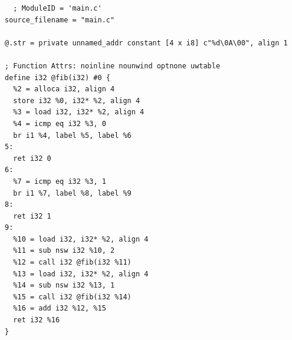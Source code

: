 \documentclass[dvipdfmx]{jarticle}
\begin{document}
\begin{Verbatim}
  ; ModuleID = 'main.c'
source_filename = "main.c"

@.str = private unnamed_addr constant [4 x i8] c"%d\0A\00", align 1

; Function Attrs: noinline nounwind optnone uwtable
define i32 @fib(i32) #0 {
  %2 = alloca i32, align 4
  store i32 %0, i32* %2, align 4
  %3 = load i32, i32* %2, align 4
  %4 = icmp eq i32 %3, 0
  br i1 %4, label %5, label %6
5:
  ret i32 0
6:
  %7 = icmp eq i32 %3, 1
  br i1 %7, label %8, label %9
8:
  ret i32 1
9:
  %10 = load i32, i32* %2, align 4
  %11 = sub nsw i32 %10, 2
  %12 = call i32 @fib(i32 %11)
  %13 = load i32, i32* %2, align 4
  %14 = sub nsw i32 %13, 1
  %15 = call i32 @fib(i32 %14)
  %16 = add i32 %12, %15
  ret i32 %16
}
\end{Verbatim}
\end{document}
